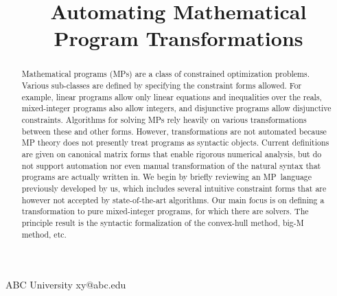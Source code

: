 \documentclass[preprint]{sigplanconf}%
\theoremstyle{remark}
\begin{document}
%
\copyrightdata{[to be supplied]}
\title{Automating Mathematical Program Transformations}
{ABC University}
{xy@abc.edu}
\maketitle
%

\begin{abstract}%


Mathematical programs (MPs) are a class of constrained optimization problems.
Various sub-classes are defined by specifying the constraint forms allowed.
For example, linear programs allow only linear equations and inequalities over
the reals, mixed-integer programs also allow integers, and disjunctive
programs allow disjunctive constraints. Algorithms for solving MPs rely
heavily on various transformations between these and other forms. However,
transformations are not automated because MP theory does not presently treat
programs as syntactic objects. Current definitions are given on canonical
matrix forms that enable rigorous numerical analysis, but do not support
automation nor even manual transformation of the natural syntax that programs
are actually written in. We begin by briefly reviewing an MP\ language
previously developed by us, which includes several intuitive constraint forms
that are however not accepted by state-of-the-art algorithms. Our main focus
is on defining a transformation to pure mixed-integer programs, for which
there are solvers. The principle result is the syntactic formalization of the
convex-hull method, big-M method, etc.%

\end{abstract}%
%
\end{document}
